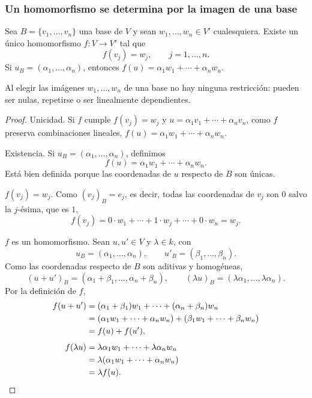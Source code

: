 \begin{frame}[allowframebreaks, t]
    \frametitle{Un homomorfismo se determina por la imagen de una base}

    \begin{theorem}
        Sea $B=\{v_1,\ldots,v_n\}$ una base de $V$ y sean
        $w_1,\ldots,w_n\in V'$ \alert{cualesquiera}. Existe un único
        homomorfismo $f\colon V\to V'$ tal que
        \[
            f(v_j)=w_j,\qquad j=1,\ldots,n.
        \]
        Si $u_B=(\alpha_1,\ldots,\alpha_n)$, entonces
        $f(u)=\alpha_1w_1+\cdots+\alpha_nw_n$.
    \end{theorem}

        Al elegir las imágenes $w_1,\ldots,w_n$ de una base \alert{no hay
    ninguna restricción}: pueden ser nulas, repetirse o ser linealmente
    dependientes.


    \framebreak

    \begin{proof}
        \alert{Unicidad.} Si $f$ cumple $f(v_j)=w_j$ y
        $u=\alpha_1v_1+\cdots+\alpha_nv_n$, como $f$ preserva
        combinaciones lineales,
        $f(u)=\alpha_1w_1+\cdots+\alpha_nw_n$.

        \medskip

        \alert{Existencia.} Si $u_B=(\alpha_1,\ldots,\alpha_n)$,
        definimos
        \[
            f(u)=\alpha_1w_1+\cdots+\alpha_nw_n.
        \]
        Está bien definida porque las coordenadas de $u$ respecto de $B$ son
        únicas.

        \medskip

        \alert{$f(v_j)=w_j$.} Como $(v_j)_B=e_j$, es decir, todas las
        coordenadas de $v_j$ son $0$ salvo la $j$-ésima, que es $1$,
        \[
            f(v_j)=0\cdot w_1+\cdots+1\cdot w_j+\cdots+0\cdot w_n=w_j.
        \]

        \framebreak

        \alert{$f$ es un homomorfismo.} Sean $u,u'\in V$ y $\lambda\in k$,
        con
        \[
            u_B=(\alpha_1,\ldots,\alpha_n),\qquad u'_B=(\beta_1,\ldots,\beta_n).
        \]
        Como las coordenadas respecto de $B$ son aditivas y homogéneas,
        \[
            (u+u')_B=(\alpha_1+\beta_1,\ldots,\alpha_n+\beta_n),
            \qquad
            (\lambda u)_B=(\lambda \alpha_1,\ldots,\lambda \alpha_n).
        \]
        Por la definición de $f$,
        \begin{align*}
            f(u+u')&=(\alpha_1+\beta_1)w_1+\cdots+(\alpha_n+\beta_n)w_n\\
            &=(\alpha_1w_1+\cdots+\alpha_nw_n)+(\beta_1w_1+\cdots+\beta_nw_n)\\
            &=f(u)+f(u'),\\[1ex]
            f(\lambda u)&=\lambda \alpha_1w_1+\cdots+\lambda \alpha_nw_n\\
            &=\lambda(\alpha_1w_1+\cdots+\alpha_nw_n)\\
            &=\lambda f(u).\qedhere
        \end{align*}
    \end{proof}
\end{frame}


